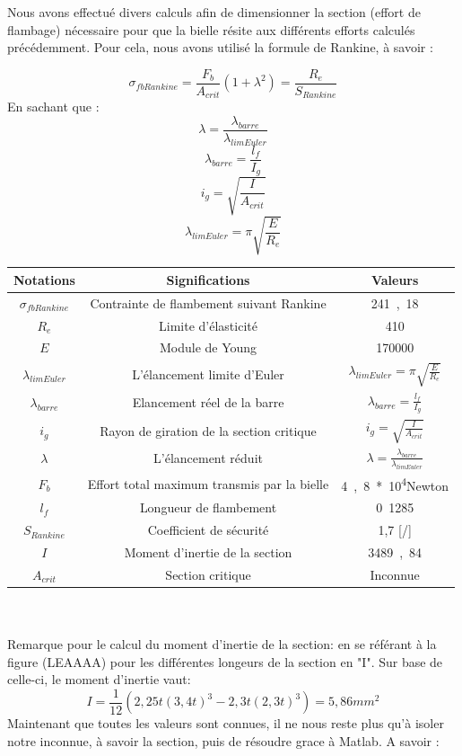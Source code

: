 \documentclass{article}
\begin{document}
Nous avons effectué divers calculs afin de dimensionner la section (effort de flambage) nécessaire pour que la bielle résite aux différents efforts calculés précédemment. Pour cela, nous avons utilisé la formule de Rankine, à savoir : 
{$$\sigma_{fb Rankine} = \frac{F_b}{A_{crit}}(1+\lambda^2) = \frac{R_e}{S_{Rankine}}$$
En sachant que : 
$$ \lambda = \frac{\lambda_{barre}}{\lambda_{lim Euler}} $$
$$ \lambda_{barre} = \frac{l_{f}}{I_g}$$
$$ i_g = \sqrt{\frac{I}{A_{crit}}}$$
$$ \lambda_{lim Euler} = \pi \sqrt{\frac{E}{R_e}}$$

 \begin{tabular}{|c|c|c|}
        \hline
    		\textbf{Notations}&\textbf{Significations}&\textbf{Valeurs}\\
		\hline 
		$\sigma_{fb Rankine}$ & Contrainte de flambement suivant Rankine & \unit{241,18}{} \\ 
		\hline 
		$R_e$ & Limite d'élasticité & \unit{410}{\pascal} \\ 
		\hline 
		$E$ & Module de Young & \unit{170000}{\pascal} \\ 
		\hline 
		$\lambda_{lim Euler}$ & L'élancement limite d'Euler & $ \lambda_{lim Euler} = \pi \sqrt{\frac{E}{R_e}}$ \\ 
		\hline 
		$\lambda_{barre}$ & Elancement réel de la barre & $ \lambda_{barre} = \frac{l_{f}}{I_g}$\\
		\hline 
		$i_g$ & Rayon de giration de la section critique & $ i_g = \sqrt{\frac{I}{A_{crit}}}$ \\
		\hline 
		$\lambda$ & L'élancement réduit & $ \lambda = \frac{\lambda_{barre}}{\lambda_{lim Euler}} $ \\
		\hline 
		$F_b$ & Effort total maximum transmis par la bielle & \unit{4,8*10^4}{Newton}\\
		\hline 
		$l_f$ & Longueur de flambement & \unit{0.1285}{} \\
		\hline 
		$S_{Rankine}$ & Coefficient de sécurité & {1,7} [/] \\
		\hline 
		$I$ & Moment d'inertie de la section & \unit{3489,84}{\pascal} \\
		\hline
		$A_{crit}$ & Section critique & Inconnue\\
		\hline 
		\end{tabular} \\
		\\
Remarque pour le calcul du moment d'inertie de la section: en se référant à la figure (LEAAAA) pour les différentes longeurs de la section en "I". Sur base de celle-ci, le moment d'inertie vaut:
$$ I = \frac{1}{12} (2,25t (3,4t)^3 - 2,3t (2,3t)^3) = \unit{5,86}{mm^2}$$
Maintenant que toutes les valeurs sont connues, il ne nous reste plus qu'à isoler notre inconnue, à savoir la section, puis de résoudre grace à Matlab. A savoir : 

}
\end{document}
